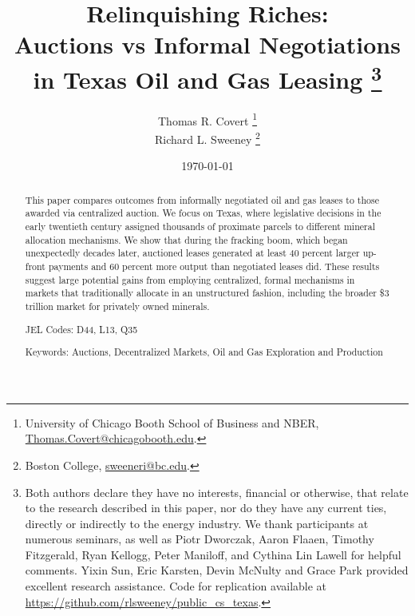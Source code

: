 \documentclass[12pt]{article}
\begin{document}
\title{Relinquishing Riches: \\ Auctions vs Informal Negotiations \\ in Texas Oil and Gas Leasing
\thanks{Both authors declare they have no interests, financial or otherwise, that relate to the research described in this paper, nor do they have any current ties, directly or indirectly to the energy industry. We thank participants at numerous seminars, as well as Piotr Dworczak, Aaron Flaaen, Timothy Fitzgerald, Ryan Kellogg, Peter Maniloff, and Cythina Lin Lawell for helpful comments.  Yixin Sun, Eric Karsten, Devin McNulty and Grace Park provided excellent research assistance. Code for replication available at \href{https://github.com/rlsweeney/public_cs_texas}{https://github.com/rlsweeney/public\_cs\_texas}.}
\vspace{10pt}}

\author{Thomas R. Covert \thanks{University of Chicago Booth School of Business and NBER, \protect\href{mailto:Thomas.Covert@chicagobooth.edu}{Thomas.Covert@chicagobooth.edu}.}
\\
 Richard L. Sweeney \thanks{Boston College, \protect\href{mailto:sweeneri@bc.edu}{sweeneri@bc.edu}.}}

\date{\today \\
 \vspace{0.5cm}
}
\maketitle
\begin{abstract}

This paper compares outcomes from informally negotiated oil and gas leases to those awarded via centralized auction. We focus on Texas, where legislative decisions in the early twentieth century assigned thousands of proximate parcels to different mineral allocation mechanisms. We show that during the fracking boom, which began unexpectedly decades later, auctioned leases generated at least 40 percent larger up-front payments and 60 percent more output than negotiated leases did.  These results suggest large potential gains from employing centralized, formal mechanisms in markets that traditionally allocate in an unstructured fashion, including the broader \$3 trillion market for privately owned minerals.

\bigskip{}

\noindent
JEL Codes: D44, L13, Q35

\medskip

\noindent
Keywords: Auctions, Decentralized Markets, Oil and Gas Exploration and Production

\bigskip{}
\end{abstract}
\setcounter{page}{1} \onehalfspace
\end{document}
